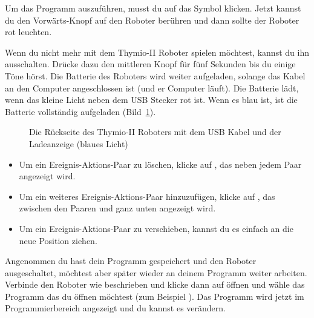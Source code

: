 
Um das Programm auszuführen, musst du auf das Symbol  klicken. Jetzt
kannst du den Vorwärts-Knopf auf den Roboter berühren und dann sollte der
Roboter rot leuchten.


Wenn du nicht mehr mit dem Thymio-II Roboter spielen möchtest, kannst du ihn
ausschalten. Drücke dazu den mittleren Knopf für fünf Sekunden bis du einige
Töne hörst. Die Batterie des Roboters wird weiter aufgeladen, solange das Kabel
an den Computer angeschlossen ist (und er Computer läuft). Die Batterie lädt,
wenn das kleine Licht neben dem USB Stecker rot ist. Wenn es blau ist, ist die
Batterie vollständig aufgeladen (Bild~\ref{fig.back}).

\begin{figure}
\begin{center}
\caption{Die Rückseite des Thymio-II Roboters mit dem USB Kabel und der
Ladeanzeige (blaues Licht)}\label{fig.back}
\end{center}
\end{figure}


\begin{itemize}
\item Um ein Ereignis-Aktions-Paar zu löschen, klicke auf , das neben
    jedem Paar angezeigt wird.
\item Um ein weiteres Ereignis-Aktions-Paar hinzuzufügen, klicke auf
    , das zwischen den Paaren und ganz unten angezeigt wird.
\item Um ein Ereignis-Aktions-Paar zu verschieben, kannst du es einfach an die
    neue Position ziehen.
\end{itemize}


Angenommen du hast dein Programm gespeichert und den Roboter ausgeschaltet,
möchtest aber später wieder an deinem Programm weiter arbeiten. Verbinde den
Roboter wie beschrieben und klicke dann auf öffnen  und wähle das
Programm das du öffnen möchtest (zum Beispiel ). Das Programm
wird jetzt im Programmierbereich angezeigt und du kannst es verändern.


